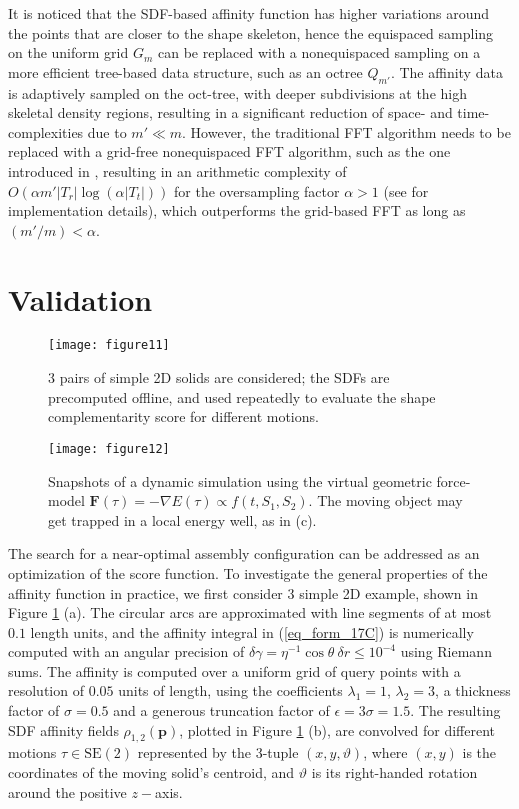 \documentclass[article]{gmp2014}
\theoremstyle{definition}
\begin{document}
It is noticed that the SDF-based affinity function has higher variations around the points that are closer to the shape skeleton, hence the equispaced sampling on the uniform grid $G_m$ can be replaced with a nonequispaced sampling on a more efficient tree-based data structure, such as an octree $Q_{m'}$. The affinity data is adaptively sampled on the oct-tree, with deeper subdivisions at the high skeletal density regions, resulting in a significant reduction of space- and time-complexities due to $m' \ll m$. However, the traditional FFT algorithm \cite{Cooley1965} needs to be replaced with a grid-free nonequispaced FFT algorithm, such as the one introduced in \cite{Potts2001}, resulting in an arithmetic complexity of $O(\alpha m' |T_r| \log (\alpha |T_t|))$ for the oversampling factor $\alpha > 1$ (see \cite{Potts2001} for implementation details), which outperforms the grid-based FFT as long as $(m'/m) < \alpha$.


\section{Validation} \label{sec_validation}

%
\begin{figure}
    \centering
    \texttt{[image: figure11]}
    \caption{3 pairs of simple 2D solids are considered; the SDFs are precomputed offline, and used repeatedly to evaluate the shape complementarity score for different motions.} \label{figure11}
\end{figure}
%

%
\begin{figure}
    \centering
    \texttt{[image: figure12]}
    \caption{Snapshots of a dynamic simulation using the virtual geometric force-model $\mathbf{F}(\tau) = -\nabla E(\tau) \propto f(t, S_1, S_2)$. The moving object may get trapped in a local energy well, as in (c).} \label{figure12}
\end{figure}
%

The search for a near-optimal assembly configuration can be addressed as an optimization of the score function. To investigate the general properties of the affinity function in practice, we first consider 3 simple 2D example, shown in Figure \ref{figure11} (a). The circular arcs are approximated with line segments of at most $0.1$ length units, and the affinity integral in (\ref{eq_form_17C}) is numerically computed with an angular precision of $\delta \gamma = \eta^{-1} \cos \theta ~\delta r \leq 10^{-4}$ using Riemann sums. The affinity is computed over a uniform grid of query points with a resolution of $0.05$ units of length, using the coefficients $\lambda_1 = 1$, $\lambda_2 = 3$, a thickness factor of $\sigma = 0.5$ and a generous truncation factor of $\epsilon = 3\sigma = 1.5$. The resulting SDF affinity fields $\rho_{1,2}(\mathbf{p})$, plotted in Figure \ref{figure11} (b), are convolved for different motions $\tau \in \mathrm{SE}(2)$ represented by the 3-tuple $(x, y, \vartheta)$, where $(x,y)$ is the coordinates of the moving solid's centroid, and $\vartheta$ is its right-handed rotation around the positive $z-$axis.
\end{document}
